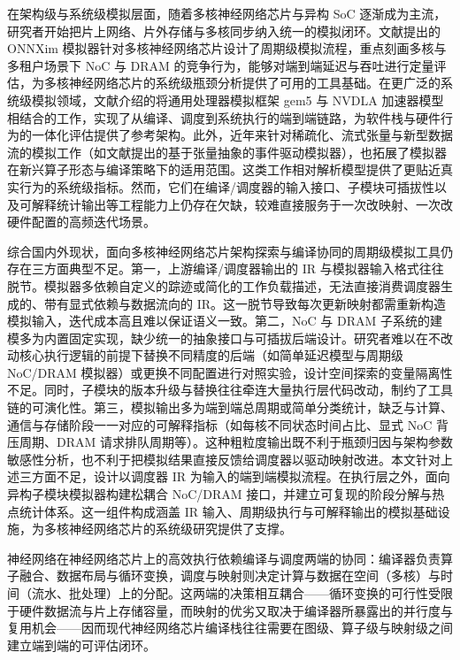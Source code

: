 在架构级与系统级模拟层面，随着多核神经网络芯片与异构 SoC 逐渐成为主流，研究者开始把片上网络、片外存储与多核同步纳入统一的模拟闭环。文献\parencite{jin2024onnxim}提出的 ONNXim 模拟器针对多核神经网络芯片设计了周期级模拟流程，重点刻画多核与多租户场景下 NoC 与 DRAM 的竞争行为，能够对端到端延迟与吞吐进行定量评估，为多核神经网络芯片的系统级瓶颈分析提供了可用的工具基础。在更广泛的系统级模拟领域，文献\parencite{zhang2023gem5nvdla}介绍的将通用处理器模拟框架 gem5 与 NVDLA 加速器模型相结合的工作，实现了从编译、调度到系统执行的端到端链路，为软件栈与硬件行为的一体化评估提供了参考架构。此外，近年来针对稀疏化、流式张量与新型数据流的模拟工作（如文献\parencite{set2023isca}提出的基于张量抽象的事件驱动模拟器），也拓展了模拟器在新兴算子形态与编译策略下的适用范围。这类工作相对解析模型提供了更贴近真实行为的系统级指标。然而，它们在编译/调度器的输入接口、子模块可插拔性以及可解释统计输出等工程能力上仍存在欠缺，较难直接服务于一次改映射、一次改硬件配置的高频迭代场景。

综合国内外现状，面向多核神经网络芯片架构探索与编译协同的周期级模拟工具仍存在三方面典型不足。第一，上游编译/调度器输出的 IR 与模拟器输入格式往往脱节。模拟器多依赖自定义的踪迹或简化的工作负载描述，无法直接消费调度器生成的、带有显式依赖与数据流向的 IR。这一脱节导致每次更新映射都需重新构造模拟输入，迭代成本高且难以保证语义一致。第二，NoC 与 DRAM 子系统的建模多为内置固定实现，缺少统一的抽象接口与可插拔后端设计。研究者难以在不改动核心执行逻辑的前提下替换不同精度的后端（如简单延迟模型与周期级 NoC/DRAM 模拟器）或更换不同配置进行对照实验，设计空间探索的变量隔离性不足。同时，子模块的版本升级与替换往往牵连大量执行层代码改动，制约了工具链的可演化性。第三，模拟输出多为端到端总周期或简单分类统计，缺乏与计算、通信与存储阶段一一对应的可解释指标（如每核不同状态时间占比、显式 NoC 背压周期、DRAM 请求排队周期等）。这种粗粒度输出既不利于瓶颈归因与架构参数敏感性分析，也不利于把模拟结果直接反馈给调度器以驱动映射改进。本文针对上述三方面不足，设计以调度器 IR 为输入的端到端模拟流程。在执行层之外，面向异构子模块模拟器构建松耦合 NoC/DRAM 接口，并建立可复现的阶段分解与热点统计体系。这一组件构成涵盖 IR 输入、周期级执行与可解释输出的模拟基础设施，为多核神经网络芯片的系统级研究提供了支撑。


神经网络在神经网络芯片上的高效执行依赖编译与调度两端的协同：编译器负责算子融合、数据布局与循环变换，调度与映射则决定计算与数据在空间（多核）与时间（流水、批处理）上的分配。这两端的决策相互耦合——循环变换的可行性受限于硬件数据流与片上存储容量，而映射的优劣又取决于编译器所暴露出的并行度与复用机会——因而现代神经网络芯片编译栈往往需要在图级、算子级与映射级之间建立端到端的可评估闭环。

